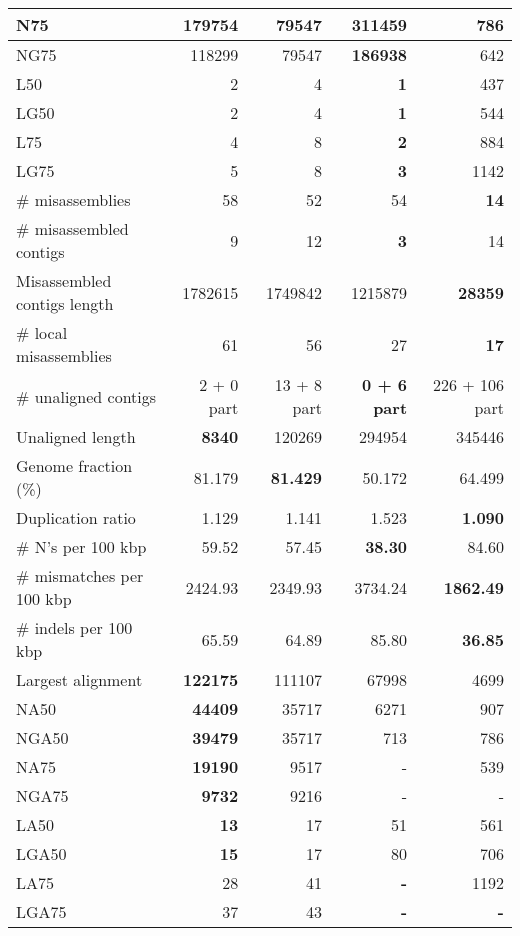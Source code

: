 \documentclass[12pt,a4paper]{article}
\begin{document}
\begin{table}[ht]
\begin{center}
\begin{tabular}{|l*{4}{|r}|}
N75 & 179754 & 79547 & {\bf 311459} & 786 \\ \hline
NG75 & 118299 & 79547 & {\bf 186938} & 642 \\ \hline
L50 & 2 & 4 & {\bf 1} & 437 \\ \hline
LG50 & 2 & 4 & {\bf 1} & 544 \\ \hline
L75 & 4 & 8 & {\bf 2} & 884 \\ \hline
LG75 & 5 & 8 & {\bf 3} & 1142 \\ \hline
\# misassemblies & 58 & 52 & 54 & {\bf 14} \\ \hline
\# misassembled contigs & 9 & 12 & {\bf 3} & 14 \\ \hline
Misassembled contigs length & 1782615 & 1749842 & 1215879 & {\bf 28359} \\ \hline
\# local misassemblies & 61 & 56 & 27 & {\bf 17} \\ \hline
\# unaligned contigs & 2 + 0 part & 13 + 8 part & {\bf 0 + 6 part} & 226 + 106 part \\ \hline
Unaligned length & {\bf 8340} & 120269 & 294954 & 345446 \\ \hline
Genome fraction (\%) & 81.179 & {\bf 81.429} & 50.172 & 64.499 \\ \hline
Duplication ratio & 1.129 & 1.141 & 1.523 & {\bf 1.090} \\ \hline
\# N's per 100 kbp & 59.52 & 57.45 & {\bf 38.30} & 84.60 \\ \hline
\# mismatches per 100 kbp & 2424.93 & 2349.93 & 3734.24 & {\bf 1862.49} \\ \hline
\# indels per 100 kbp & 65.59 & 64.89 & 85.80 & {\bf 36.85} \\ \hline
Largest alignment & {\bf 122175} & 111107 & 67998 & 4699 \\ \hline
NA50 & {\bf 44409} & 35717 & 6271 & 907 \\ \hline
NGA50 & {\bf 39479} & 35717 & 713 & 786 \\ \hline
NA75 & {\bf 19190} & 9517 & - & 539 \\ \hline
NGA75 & {\bf 9732} & 9216 & - & - \\ \hline
LA50 & {\bf 13} & 17 & 51 & 561 \\ \hline
LGA50 & {\bf 15} & 17 & 80 & 706 \\ \hline
LA75 & 28 & 41 & {\bf -} & 1192 \\ \hline
LGA75 & 37 & 43 & {\bf -} & {\bf -} \\ \hline
\end{tabular}
\end{center}
\end{table}
\end{document}
